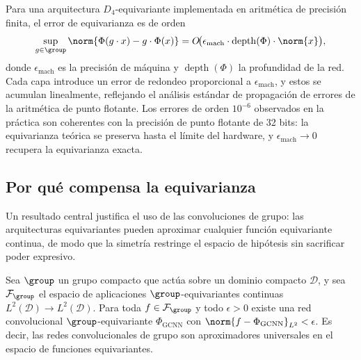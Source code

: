 \begin{remark}
\label{rem:groups:numerical-stability}
Para una arquitectura $D_4$-equivariante implementada en aritm\'etica de
precisi\'on finita, el error de equivarianza es de orden
\begin{equation}
  \sup_{g \in \group} \norm{\Phi(g \cdot x) - g \cdot \Phi(x)}
  = O\!\big(\epsilon_{\text{mach}} \cdot \operatorname{depth}(\Phi)
    \cdot \norm{x}\big),
\end{equation}
donde $\epsilon_{\text{mach}}$ es la precisi\'on de m\'aquina y
$\operatorname{depth}(\Phi)$ la profundidad de la red. Cada capa introduce un
error de redondeo proporcional a $\epsilon_{\text{mach}}$, y estos se acumulan
linealmente, reflejando el an\'alisis est\'andar de propagaci\'on de errores de
la aritm\'etica de punto flotante. Los errores de orden $10^{-6}$ observados en
la pr\'actica son coherentes con la precisi\'on de punto flotante de 32 bits: la
equivarianza te\'orica se preserva hasta el l\'imite del hardware, y
$\epsilon_{\text{mach}} \to 0$ recupera la equivarianza exacta.
\end{remark}

\subsection{Por qu\'e compensa la equivarianza}
\label{sec:groups:why-pays}

Un resultado central justifica el uso de las convoluciones de grupo: las
arquitecturas equivariantes pueden aproximar cualquier funci\'on equivariante
continua, de modo que la simetr\'ia restringe el espacio de hip\'otesis sin
sacrificar poder expresivo.

\begin{theorem}
\label{thm:groups:universality}
Sea $\group$ un grupo compacto que act\'ua sobre un dominio compacto
$\mathcal{D}$, y sea $\mathcal{F}_{\group}$ el espacio de aplicaciones
$\group$-equivariantes continuas $L^2(\mathcal{D}) \to L^2(\mathcal{D})$. Para
toda $f \in \mathcal{F}_{\group}$ y todo $\epsilon > 0$ existe una red
convolucional $\group$-equivariante $\Phi_{\text{GCNN}}$ con $\norm{f -
\Phi_{\text{GCNN}}}_{L^2} < \epsilon$. Es decir, las redes convolucionales de
grupo son aproximadores universales en el espacio de funciones equivariantes.
\end{theorem}

